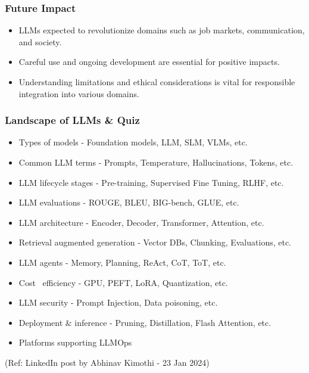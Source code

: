 \begin{frame}[fragile]
  \frametitle{Future Impact}

  \begin{itemize}
    \item LLMs expected to revolutionize domains such as job markets, communication, and society.
    \item Careful use and ongoing development are essential for positive impacts.
    \item Understanding limitations and ethical considerations is vital for responsible integration into various domains.
  \end{itemize}
\end{frame}

\begin{frame}[fragile]\frametitle{Landscape of LLMs \& Quiz}

\begin{itemize}
\item Types of models - Foundation models, LLM, SLM, VLMs, etc.
\item Common LLM terms - Prompts, Temperature, Hallucinations, Tokens, etc.
\item LLM lifecycle stages - Pre-training, Supervised Fine Tuning, RLHF, etc.
\item LLM evaluations - ROUGE, BLEU, BIG-bench, GLUE, etc.
\item LLM architecture - Encoder, Decoder, Transformer, Attention, etc.
\item Retrieval augmented generation - Vector DBs, Chunking, Evaluations, etc.
\item LLM agents - Memory, Planning, ReAct, CoT, ToT, etc.
\item Cost \ efficiency - GPU, PEFT, LoRA, Quantization, etc.
\item LLM security - Prompt Injection, Data poisoning, etc.
\item Deployment \& inference - Pruning, Distillation, Flash Attention, etc.
\item Platforms supporting LLMOps
\end{itemize}	 

{\tiny (Ref: LinkedIn post by Abhinav Kimothi - 23 Jan 2024)}
\end{frame}


